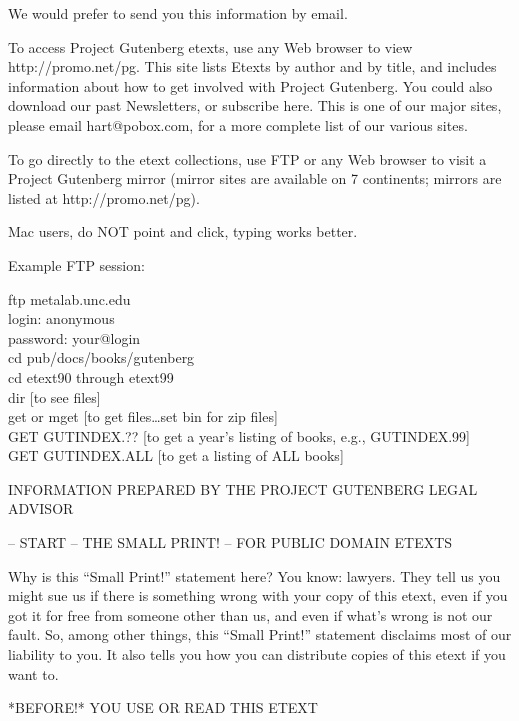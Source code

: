 \documentclass[12pt]{book}
\begin{document}
We would prefer to send you this information by email.

\newpage

To access Project Gutenberg etexts, use any Web browser
to view \newline http://promo.net/pg.  This site lists Etexts by
author and by title, and includes information about how
to get involved with Project Gutenberg.  You could also
download our past Newsletters, or subscribe here.  This
is one of our major sites, please email hart@pobox.com,
for a more complete list of our various sites.

To go directly to the etext collections, use FTP or any
Web browser to visit a Project Gutenberg mirror (mirror
sites are available on 7 continents; mirrors are listed
at http://promo.net/pg).

Mac users, do NOT point and click, typing works better.

Example FTP session:

\noindent ftp metalab.unc.edu\\
login: anonymous\\
password: your@login\\
cd pub/docs/books/gutenberg\\
cd etext90 through etext99\\
dir [to see files]\\
get or mget [to get files\ldots set bin for zip files]\\
GET GUTINDEX.??  [to get a year's listing of books, e.g., GUTINDEX.99]\\
GET GUTINDEX.ALL [to get a listing of ALL books]\\

\newpage

\begin{center}
{\Large INFORMATION PREPARED BY THE PROJECT GUTENBERG LEGAL ADVISOR}
\end{center}


-- START -- THE SMALL PRINT! -- FOR PUBLIC DOMAIN ETEXTS

Why is this ``Small Print!'' statement here?  You know: lawyers.
They tell us you might sue us if there is something wrong with
your copy of this etext, even if you got it for free from
someone other than us, and even if what's wrong is not our
fault.  So, among other things, this ``Small Print!'' statement
disclaims most of our liability to you.  It also tells you how
you can distribute copies of this etext if you want to.

\begin{center}
*BEFORE!* YOU USE OR READ THIS ETEXT
\end{center}
\end{document}
